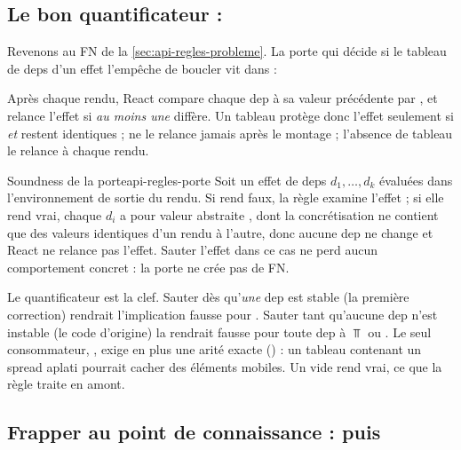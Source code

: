 \subsection{Le bon quantificateur : }
\label{sec:api-regles-forall}

Revenons au FN de la \cref{sec:api-regles-probleme}. La porte qui décide si le tableau de deps d'un effet l'empêche de boucler vit dans  :


\begin{react}
Après chaque rendu, React compare chaque dep à sa valeur précédente par , et relance l'effet si \emph{au moins une} diffère. Un tableau \code{[a, b]} protège donc l'effet seulement si  \emph{et}  restent identiques ; \code{[]} ne le relance jamais après le montage ; l'absence de tableau le relance à chaque rendu.
\end{react}

\begin{proposition}{Soundness de la porte}{api-regles-porte}
Soit un effet de deps $d_1, \ldots, d_k$ évaluées dans l'environnement de sortie du rendu. Si  rend faux, la règle examine l'effet ; si elle rend vrai, chaque $d_i$ a pour valeur abstraite , dont la concrétisation ne contient que des valeurs identiques d'un rendu à l'autre, donc aucune dep ne change et React ne relance pas l'effet. Sauter l'effet dans ce cas ne perd aucun comportement concret : la porte ne crée pas de FN.
\end{proposition}

Le quantificateur est la clef. Sauter dès qu'\emph{une} dep est stable (la première correction) rendrait l'implication fausse pour . Sauter tant qu'aucune dep n'est \og instable\fg{} (le code d'origine) la rendrait fausse pour toute dep à $\Top$ ou . Le seul consommateur, , exige en plus une arité exacte () : un tableau contenant un spread aplati pourrait cacher des éléments mobiles. Un  vide rend vrai, ce que la règle traite en amont.

\subsection{Frapper au point de connaissance :  puis }
\label{sec:api-regles-motion}

